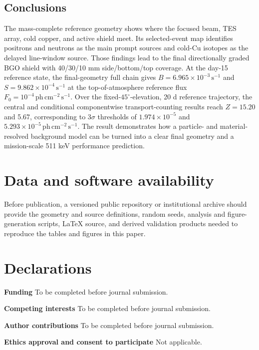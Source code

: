 \documentclass[11pt]{article}
\newcommand{\phcms}{\ensuremath{\,\mathrm{ph\,cm^{-2}\,s^{-1}}}}
\newcommand{\cps}{\ensuremath{\,\mathrm{s^{-1}}}}
\newcommand{\fzero}{F_{0}}
\begin{document}
\subsection{Conclusions}
\label{sec:conclusions}

The mass-complete reference geometry shows where the focused beam, TES array,
cold copper, and active shield meet. Its selected-event map identifies positrons and
neutrons as the main prompt sources and cold-Cu isotopes as the delayed line-window
source. Those findings lead to the final directionally graded BGO shield with
40/30/10 mm side/bottom/top coverage. At the day-15 reference state, the
final-geometry full chain gives
$B=6.965\times10^{-3}\cps$ and $S=9.862\times10^{-4}\cps$ at the
top-of-atmosphere reference flux $\fzero=10^{-4}\phcms$. Over the fixed-$45^\circ$-elevation,
20 d reference trajectory, the central and conditional componentwise
transport-counting results reach $Z=15.20$ and 5.67, corresponding to
$3\sigma$ thresholds of $1.974\times10^{-5}$ and
$5.293\times10^{-5}\phcms$. The result demonstrates how a particle- and
material-resolved background model can be turned into a clear final geometry and
a mission-scale 511 keV performance prediction.

\section*{Data and software availability}
Before publication, a versioned public repository or institutional archive should provide the geometry and source definitions, random seeds, analysis and figure-generation scripts, LaTeX source, and derived validation products needed to reproduce the tables and figures in this paper.

\section*{Declarations}
\textbf{Funding} To be completed before journal submission.

\textbf{Competing interests} To be completed before journal submission.

\textbf{Author contributions} To be completed before journal submission.

\textbf{Ethics approval and consent to participate} Not applicable.
\end{document}
